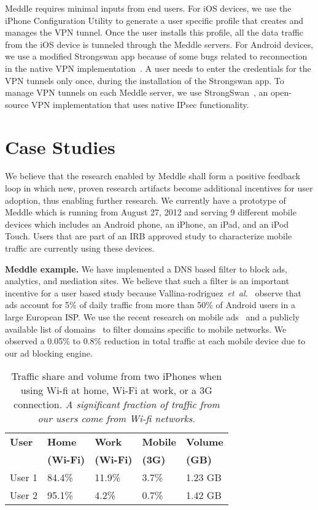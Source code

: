 \documentclass{sig-alternate}
\newcommand{\etal}{\emph{et~al.}}
\newcommand{\meddle}{{Meddle}\xspace}
\begin{document}
\meddle requires minimal inputs from end users. For iOS devices, we
use the iPhone Configuration Utility to generate a user specific
profile that creates and manages the VPN tunnel. Once the user installs
this profile, all the data traffic from the iOS  device is tunneled
through the \meddle servers. For Android devices, we use a modified
Strongswan app because of some bugs related to reconnection in the
native VPN  implementation~\cite{OnDemandAndroid}. A user needs to
enter the credentials for the VPN tunnels only once, during the
installation of the Strongswan app. To manage VPN tunnels on each
\meddle server, we use StrongSwan~\cite{strongswan}, an open-source
VPN implementation that uses native IPsec functionality.   

\section{Case Studies}

We believe that the research enabled by \meddle shall form a positive
feedback loop in which new, proven research artifacts become
additional incentives for user adoption, thus enabling further
research. We currently have a prototype of \meddle which is running
from August 27, 2012 and serving 9 different mobile devices which
includes an Android phone, an iPhone, an iPad, and an iPod
Touch. Users that are part of an IRB approved study to characterize
mobile traffic are currently using these devices. 

\textbf{\meddle example.} We have implemented a DNS based filter to
block ads, analytics, and mediation sites. We believe that such a filter is
an important incentive for a user based study because
Vallina-rodriguez~\etal~\cite{Vallina-rodriguez:2012:AdCache} observe
that ads account for 5\% of daily traffic from more than 50\% of
Android users in a large European ISP. We use the recent research on
mobile ads~\cite{hornyack:appfence, Leontiadis:2012:AdsMobile} and a
publicly available list of domains~\cite{YoyoAds} to filter
domains specific to mobile networks. We observed a 0.05\% to 0.8\%
reduction in total traffic at each mobile device due to our ad
blocking engine.  

\begin{table}
\centering
\begin{small}
\begin{tabular}{|l|l|l|l|l|}
\hline
{\bf User} & {\bf Home} & {\bf Work} & {\bf Mobile} & {\bf Volume}\\
    & {\bf (Wi-Fi)} & {\bf (Wi-Fi)} & {\bf (3G)} & {\bf (GB)}\\
\hline
User 1 & 84.4\% & 11.9\% & 3.7\%  & 1.23 GB\\
\hline
User 2 & 95.1\% & 4.2\% & 0.7\%  & 1.42 GB\\
\hline
\end{tabular}
\end{small}
\caption{Traffic share and volume from two iPhones when using Wi-fi at
  home, Wi-Fi at work, or a 3G connection. \emph{A significant
    fraction of traffic from our users come from Wi-fi networks.}}
\label{tab:Usage}
\vspace{-0.1in}
\end{table}
\end{document}
